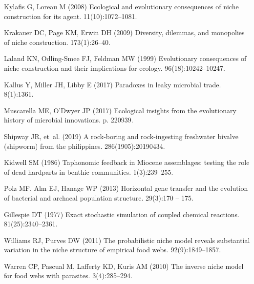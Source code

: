 \documentclass[twocolumn,preprintnumbers,amsmath,amssymb,superscriptaddress]{revtex4}
\begin{document}
\begin{thebibliography}{10}
Kylafis G, Loreau M (2008) Ecological and evolutionary consequences of niche
  construction for its agent.
 11(10):1072--1081.

Krakauer DC, Page KM, Erwin DH (2009) {Diversity, dilemmas, and monopolies of
  niche construction.}
 173(1):26--40.

Laland KN, Odling-Smee FJ, Feldman MW (1999) {Evolutionary consequences of
  niche construction and their implications for ecology}.
 96(18):10242--10247.

Kallus Y, Miller JH, Libby E (2017) {Paradoxes in leaky microbial trade}.
 8(1):1361.

Muscarella ME, O'Dwyer JP (2017) Ecological insights from the evolutionary
  history of microbial innovations.
 p. 220939.

Shipway JR, et~al. (2019) A rock-boring and rock-ingesting freshwater bivalve
  (shipworm) from the philippines.
 286(1905):20190434.

Kidwell SM (1986) Taphonomic feedback in {M}iocene assemblages: testing the
  role of dead hardparts in benthic communities.
 1(3):239--255.

Polz MF, Alm EJ, Hanage WP (2013) Horizontal gene transfer and the evolution of
  bacterial and archaeal population structure.
 29(3):170 -- 175.

Gillespie DT (1977) Exact stochastic simulation of coupled chemical reactions.
 81(25):2340--2361.

Williams RJ, Purves DW (2011) {The probabilistic niche model reveals
  substantial variation in the niche structure of empirical food webs.}
 92(9):1849--1857.

Warren CP, Pascual M, Lafferty KD, Kuris AM (2010) {The inverse niche model for
  food webs with parasites.}
 3(4):285--294.

\end{thebibliography}
\end{document}
